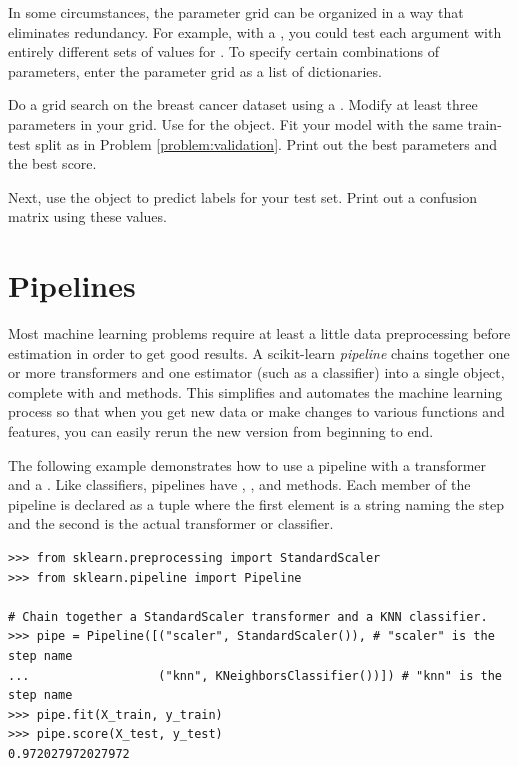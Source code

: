 In some circumstances, the parameter grid can be organized in a way that eliminates redundancy.
For example, with a , you could test each  argument with entirely different sets of values for .
To specify certain combinations of parameters, enter the parameter grid as a list of dictionaries.

\begin{problem} %
Do a grid search on the breast cancer dataset using a .
Modify at least three parameters in your grid.
Use   for the  object.
Fit your model with the same train-test split as in Problem \ref{problem:validation}.
Print out the best parameters and the best score.

Next, use the  object to predict labels for your test set.
Print out a confusion matrix using these values.
\label{problem:gridsearch}
\end{problem}

\section*{Pipelines} %

Most machine learning problems require at least a little data preprocessing before estimation in order to get good results.
A scikit-learn \emph{pipeline} chains together one or more transformers and one estimator (such as a classifier) into a single object, complete with  and  methods.
This simplifies and automates the machine learning process so that when you get new data or make changes to various functions and features, you can easily rerun the new version from beginning to end.

The following example demonstrates how to use a pipeline with a  transformer and a .
Like classifiers, pipelines have , , and  methods.
Each member of the pipeline is declared as a tuple where the first element is a string naming the step and the second is the actual transformer or classifier.

\begin{lstlisting}
>>> from sklearn.preprocessing import StandardScaler
>>> from sklearn.pipeline import Pipeline

# Chain together a StandardScaler transformer and a KNN classifier.
>>> pipe = Pipeline([("scaler", StandardScaler()), # "scaler" is the step name
...                  ("knn", KNeighborsClassifier())]) # "knn" is the step name
>>> pipe.fit(X_train, y_train)
>>> pipe.score(X_test, y_test)
0.972027972027972
\end{lstlisting}

